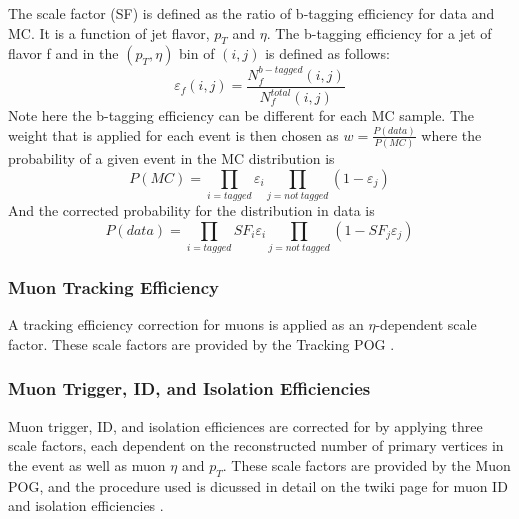 The scale factor (SF) is defined as the ratio of b-tagging efficiency for data and  MC. It is a function of jet flavor, $p_{T}$ and $\eta$. The b-tagging efficiency for a jet of flavor f and in the $(p_{T},\eta)$ bin of $(i,j)$ is defined as follows:
\begin{equation}
\varepsilon_{f} (i,j)=\frac{N_{f}^{b-tagged}(i,j)}{N_{f}^{total}(i,j)}
\end{equation}
Note here the b-tagging efficiency can be different for each MC sample. The weight that is applied for each event is then chosen as $w = \frac{P(data)}{P(MC)}$ where the probability of a given event in the MC distribution is
\begin{equation}
P(MC)=\prod_{i=tagged}\varepsilon _{i}\prod_{j=not\: tagged}(1-\varepsilon_{j})
\end{equation}
And the corrected probability for the distribution in data is
\begin{equation}
P(data)=\prod_{i=tagged}SF_{i}\varepsilon _{i}\prod_{j=not\: tagged}(1-SF_{j}\varepsilon_{j})
\end{equation}


\subsubsection{Muon Tracking Efficiency}

A tracking efficiency correction for muons is applied as an $\eta$-dependent scale factor. These scale factors are provided by the Tracking POG \cite{tracking_POG}.

\subsubsection{Muon Trigger, ID, and Isolation Efficiencies}

Muon trigger, ID, and isolation efficiences are corrected for by applying three scale factors, each dependent on the reconstructed number of primary vertices in the event as well as muon $\eta$ and $p_T$. These scale factors are provided by the Muon POG, and the procedure used is dicussed in detail on the twiki page for muon ID and isolation efficiencies \cite{muon_eff_twiki}.

